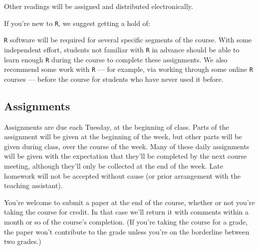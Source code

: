 \documentclass[12pt]{article}
\begin{document}


Other readings will be assigned and distributed electronically.

If you're new to \texttt{R}, we suggest getting a hold of:

\begin{verse}   \end{verse}

\begin{verse}  \end{verse}

\texttt{R} software will be required for several specific segments of the course. With some independent effort, students not familiar with \texttt{R} in advance should be able to learn enough \texttt{R} during the course to complete these assignments. We also recommend some work with \texttt{R} --- for example, via working through some online \texttt{R} courses --- before the course for students who have never used it before.


\subsection*{Assignments}
Assignments are due each Tuesday, at the beginning of
class. Parts of the assignment will be given at the beginning of the
week, but other parts will be given during class, over the course of
the week.  Many of these daily assignments will be given with the
expectation that they'll be completed by the next course meeting,
although they'll only be collected at the end of the week.
Late homework will not be accepted without cause (or prior arrangement
with the teaching assistant).

You're welcome to submit a paper at the end of the course, whether or not you're taking the course for credit.  In that case we'll return it with comments within a month or so of the course's completion.  (If you're taking the course for a grade, the paper won't contribute to the grade unless you're on the borderline between two grades.)
\end{document}
